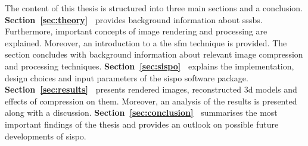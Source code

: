 The content of this thesis is structured into three main sections and a conclusion. \newline
\textbf{Section~\ref{sec:theory}~} provides background information about \glspl{sssb}. Furthermore, important concepts of image rendering and processing are explained. Moreover, an introduction to a the \gls{sfm} technique is provided. The section concludes with background information about relevant image compression and processing techniques. \newline
\textbf{Section~\ref{sec:sispo}~} explains the implementation, design choices and input parameters of the \gls{sispo} software package. \newline
\textbf{Section~\ref{sec:results}~} presents rendered images, reconstructed \gls{3d} models and effects of compression on them. Moreover, an analysis of the results is presented along with a discussion. \newline
\textbf{Section~\ref{sec:conclusion}~} summarises the most important findings of the thesis and provides an outlook on possible future developments of \gls{sispo}.


